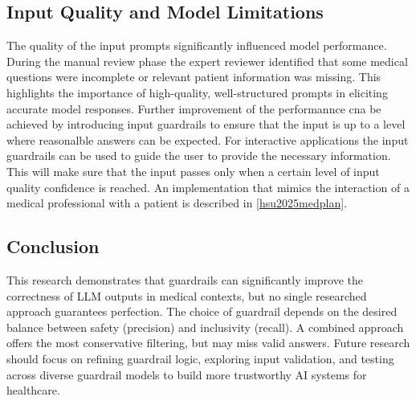 \subsection{Input Quality and Model Limitations}
The quality of the input prompts significantly influenced model performance.
During the manual review phase the expert reviewer identified that some medical questions were incomplete or relevant patient information was missing.
This highlights the importance of high-quality, well-structured prompts in eliciting accurate model responses.
Further improvement of the performannce cna be achieved by introducing input guardrails to ensure that the input is up to a level where reasonalble answers can be expected.
For interactive applications the input guardrails can be used to guide the user to provide the necessary information.
This will make sure that the input passes only when a certain level of input quality confidence is reached.
An implementation that mimics the interaction of a medical professional with a patient is described in \autoref{hsu2025medplan}.

\subsection*{Conclusion}
This research demonstrates that guardrails can significantly improve the correctness of LLM outputs in medical contexts, but no single researched approach guarantees perfection.
The choice of guardrail depends on the desired balance between safety (precision) and inclusivity (recall).
A combined approach offers the most conservative filtering, but may miss valid answers.
Future research should focus on refining guardrail logic, exploring input validation, and testing across diverse guardrail models to build more trustworthy AI systems for healthcare.
